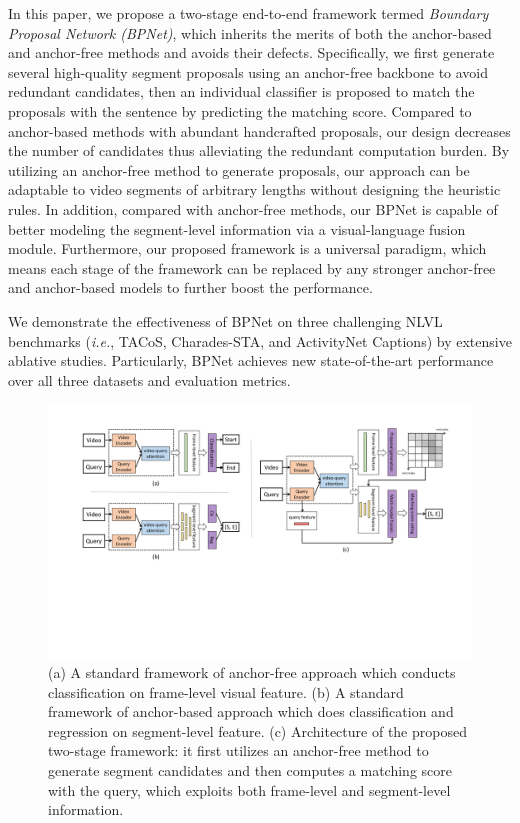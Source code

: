 \documentclass[letterpaper]{article} %
\newcommand{\ie}{\emph{i.e.}}
\begin{document}
In this paper, we propose a two-stage end-to-end framework termed \emph{Boundary Proposal Network (BPNet)}, 
which inherits the merits of both the anchor-based and anchor-free methods and avoids their defects. 
Specifically, we first generate several high-quality segment proposals using an anchor-free backbone to avoid redundant candidates, then an individual classifier is proposed to match the proposals with the sentence by predicting the matching score.
Compared to anchor-based methods with abundant handcrafted proposals, our design decreases the number of candidates thus alleviating the redundant computation burden.
By utilizing an anchor-free method to generate proposals, our approach can be adaptable to video segments of arbitrary lengths without designing the heuristic rules.
In addition, compared with anchor-free methods, our BPNet is capable of better modeling the segment-level information via a visual-language fusion module.
Furthermore, our proposed framework is a universal paradigm, which means each stage of the framework can be replaced by any stronger anchor-free and anchor-based models to further boost the performance.

We demonstrate the effectiveness of BPNet on three challenging NLVL benchmarks (\ie, TACoS, Charades-STA, and ActivityNet Captions) by extensive ablative studies. Particularly, BPNet achieves new state-of-the-art performance over all three datasets and evaluation metrics. 


\begin{figure}
\centering
\includegraphics[width=\textwidth]{figure2-1_cut.pdf}
\caption{(a) A standard framework of anchor-free approach which conducts classification on frame-level visual feature. 
(b) A standard framework of anchor-based approach which does classification 
and regression on segment-level feature.
(c) Architecture of the proposed two-stage framework: it first utilizes an 
anchor-free method to generate segment candidates and then computes a matching score with the query, which exploits both frame-level and segment-level information.
}
\label{figure2}
\end{figure}
\end{document}
